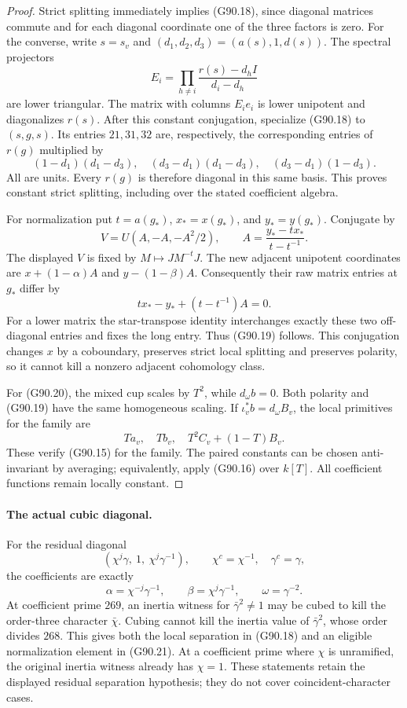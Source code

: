 \begin{proof}
Strict splitting immediately implies (G90.18), since diagonal
matrices commute and for each diagonal coordinate one of the three
factors is zero.  For the converse, write \(s=s_v\) and
\((d_1,d_2,d_3)=(a(s),1,d(s))\).  The spectral projectors
\[
 E_i=\prod_{h\ne i}\frac{r(s)-d_h I}{d_i-d_h}
\]
are lower triangular.  The matrix with columns \(E_i e_i\) is lower
unipotent and diagonalizes \(r(s)\).  After this constant conjugation,
specialize (G90.18) to \((s,g,s)\).  Its entries \(21,31,32\) are,
respectively, the corresponding entries of \(r(g)\) multiplied by
\[
 (1-d_1)(d_1-d_3),\quad
 (d_3-d_1)(d_1-d_3),\quad
 (d_3-d_1)(1-d_3).
\]
All are units.  Every \(r(g)\) is therefore diagonal in this same
basis.  This proves constant strict splitting, including over the
stated coefficient algebra.

For normalization put \(t=a(g_\ast)\), \(x_\ast=x(g_\ast)\), and
\(y_\ast=y(g_\ast)\).  Conjugate by
\[
 V=U(A,-A,-A^2/2),\qquad
 A=\frac{y_\ast-tx_\ast}{t-t^{-1}}.
 \tag{G90.21}
\]
The displayed \(V\) is fixed by \(M\mapsto JM^{-t}J\).
The new adjacent unipotent coordinates are
\(x+(1-\alpha)A\) and \(y-(1-\beta)A\).
Consequently their raw matrix entries at \(g_\ast\) differ by
\[
 t x_\ast-y_\ast+(t-t^{-1})A=0.
\]
For a lower matrix the star-transpose identity interchanges exactly
these two off-diagonal entries and fixes the long entry.  Thus
(G90.19) follows.  This conjugation changes \(x\) by a coboundary,
preserves strict local splitting and preserves polarity, so it cannot
kill a nonzero adjacent cohomology class.

For (G90.20), the mixed cup scales by \(T^2\), while \(d_\omega b=0\).
Both polarity and (G90.19) have the same homogeneous scaling.
If \(\iota_v^*b=d_\omega B_v\), the local primitives for the family are
\[
 T a_v,\quad T b_v,\quad T^2 C_v+(1-T)B_v.
\]
These verify (G90.15) for the family.  The paired constants can be
chosen anti-invariant by averaging; equivalently, apply (G90.16)
over \(k[T]\).  All coefficient functions remain locally constant.
\end{proof}

\paragraph{The actual cubic diagonal.}
For the residual diagonal
\[
 (\chi^j\gamma,\ 1,\ \chi^j\gamma^{-1}),\qquad
 \chi^c=\chi^{-1},\quad\gamma^c=\gamma,
\]
the coefficients are exactly
\[
 \alpha=\chi^{-j}\gamma^{-1},\qquad
 \beta=\chi^j\gamma^{-1},\qquad
 \omega=\gamma^{-2}.
 \tag{G90.22}
\]
At coefficient prime \(269\), an inertia witness for
\(\bar\gamma^2\ne1\) may be cubed to kill the order-three character
\(\bar\chi\).  Cubing cannot kill the inertia value of \(\bar\gamma^2\), whose
order divides \(268\).  This gives both the local separation in (G90.18) and an
eligible normalization element in (G90.21).  At a coefficient prime
where \(\chi\) is unramified, the original inertia witness already has
\(\chi=1\).  These statements retain the displayed residual
separation hypothesis; they do not cover coincident-character cases.

